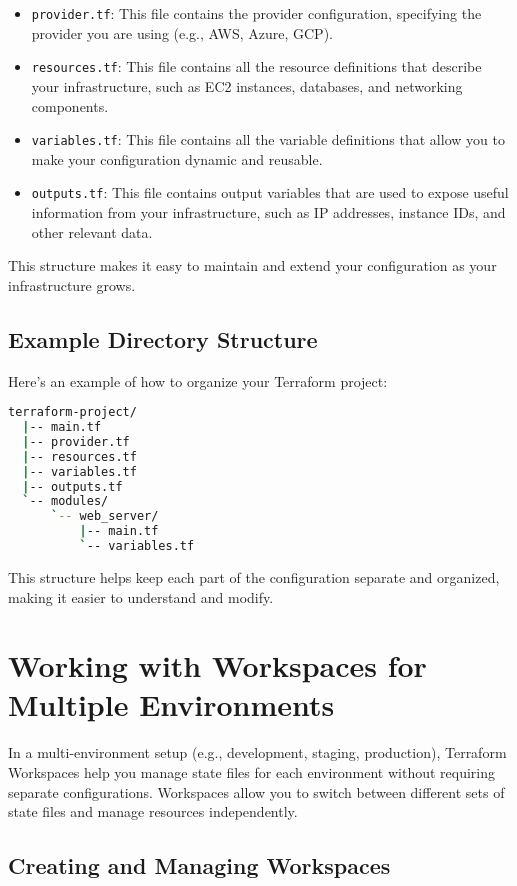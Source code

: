 \begin{itemize}
  \item \texttt{provider.tf}: This file contains the provider configuration, specifying the provider you are using (e.g., AWS, Azure, GCP).
  \item \texttt{resources.tf}: This file contains all the resource definitions that describe your infrastructure, such as EC2 instances, databases, and networking components.
  \item \texttt{variables.tf}: This file contains all the variable definitions that allow you to make your configuration dynamic and reusable.
  \item \texttt{outputs.tf}: This file contains output variables that are used to expose useful information from your infrastructure, such as IP addresses, instance IDs, and other relevant data.
\end{itemize}

This structure makes it easy to maintain and extend your configuration as your infrastructure grows.

\subsection{Example Directory Structure}

Here's an example of how to organize your Terraform project:

\begin{lstlisting}[language=bash]
  terraform-project/
  |-- main.tf
  |-- provider.tf
  |-- resources.tf
  |-- variables.tf
  |-- outputs.tf
  `-- modules/
      `-- web_server/
          |-- main.tf
          `-- variables.tf
  \end{lstlisting}

This structure helps keep each part of the configuration separate and organized, making it easier to understand and modify.

\section{Working with Workspaces for Multiple Environments}

In a multi-environment setup (e.g., development, staging, production), Terraform Workspaces help you manage state files for each environment without requiring separate configurations. Workspaces allow you to switch between different sets of state files and manage resources independently.

\subsection{Creating and Managing Workspaces}

